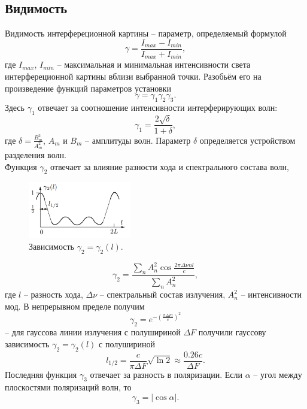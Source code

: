 \documentclass[a4paper,12pt]{article}
\begin{document}
\subsection*{Видимость}
Видимость интерфереционной картины -- параметр, определяемый формулой
\begin{equation}
\gamma = \dfrac{I_{max} - I_{min}}{I_{max} + I_{min}},
\end{equation}
где $I_{max}$, $I_{min}$ -- максимальная и минимальная интенсивности света интерфереционной картины вблизи выбранной точки. Разобьём его на произведение функций параметров установки
$$
\gamma = \gamma_1 \gamma_2 \gamma_3.
$$
Здесь $\gamma_1$ отвечает за соотношение интенсивности интерферирующих волн:
\begin{equation}
\gamma_1 = \dfrac{2\sqrt{\delta}}{1+\delta},
\end{equation}
где $\delta = \frac{B_m^2}{A_m^2}$, $A_m$ и $B_m$ -- амплитуды волн. Параметр $\delta$ определяется устройством разделения волн.\\
Функция $\gamma_2$ отвечает за влияние разности хода и спектрального состава волн,
\begin{figure}
\begin{center}
\includegraphics[width = 0.4\textwidth]{1.png}
\vspace{-20pt}
\end{center}
\caption{Зависимость $\gamma_2 = \gamma_2(l)$.}
\end{figure}
$$
\gamma_2 = \dfrac{\sum\limits_n A^2_n \cos \frac{2\pi \Delta \nu n l}{c}}{\sum\limits_n A_n^2},
$$
где $l$ -- разность хода, $\Delta \nu$ -- спектральный состав излучения, $A_n^2$ -- интенсивности мод. В непрерывном пределе получим
$$
\gamma_2 = e^{-\left(\frac{\pi \Delta F l}{c}\right)^2}
$$
-- для гауссова линии излучения с полушириной $\Delta F$ получили гауссову зависимость $\gamma_2 = \gamma_2(l)$ с полушириной
\begin{equation}
l_{1/2} = \dfrac{c}{\pi \Delta F}\sqrt{\ln 2} \approx \dfrac{0.26 c}{\Delta F}.
\end{equation}
Последняя функция $\gamma_3$ отвечает за разность в поляризации. Если $\alpha$ -- угол между плоскостями поляризаций волн, то
\begin{equation}
\gamma_3 = |\cos \alpha|.
\end{equation}
\end{document}
